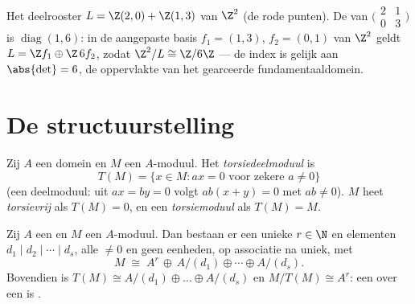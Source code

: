 \begin{omfigure}

{\small Het deelrooster $L = \Z(2,0) + \Z(1,3)$ van $\Z^2$ (de rode
punten). De  van
$\bigl(\begin{smallmatrix} 2 & 1\\ 0 & 3\end{smallmatrix}\bigr)$ is
$\operatorname{diag}(1, 6)$: in de aangepaste basis $f_1 = (1,3)$,
$f_2 = (0,1)$ van $\Z^2$ geldt $L = \Z f_1 \oplus \Z\,6f_2$, zodat
$\Z^2/L \cong \Z/6\Z$ --- de index is gelijk aan $\abs{\det} = 6$,
de oppervlakte van het gearceerde fundamentaaldomein.}
\end{omfigure}

\section{De structuurstelling}

\begin{definition}\label{def:b3:modules:torsion}
Zij $A$ een domein en $M$ een $A$-moduul. Het
\emph{torsiedeelmoduul} is
\[
T(M) = \{x \in M : ax = 0 \text{ voor zekere } a \neq 0\}
\]
(een deelmoduul: uit $ax = by = 0$ volgt $ab(x + y) = 0$ met $ab
\ne 0$). $M$ heet \emph{torsievrij} als $T(M) = 0$, en een
\emph{torsiemoduul} als $T(M) = M$.
\end{definition}

\begin{theorem}\label{thm:b3:modules:structure}
Zij $A$ een  en $M$ een 
$A$-moduul. Dan bestaan er een unieke $r \in \N$ en elementen $d_1
\mid d_2 \mid \cdots \mid d_s$, alle $\neq 0$ en geen eenheden, op
associatie na uniek, met
\[
M \;\cong\; A^r \,\oplus\, A/(d_1) \oplus \cdots \oplus A/(d_s).
\]
Bovendien is $T(M) \cong A/(d_1)\oplus\dots\oplus A/(d_s)$ en
$M/T(M) \cong A^r$: een  \emph{}
 over een  is .
\end{theorem}

